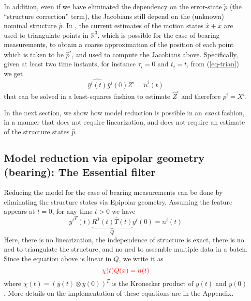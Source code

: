 \documentclass[]{article}
\def\real{\mathbb{R}}
\begin{document}
In addition, even if we have eliminated the dependency on the error-state $\tilde p$ (the ``structure correction'' term), the Jacobians still depend on the (unknown) nominal structure $\hat p$. In \cite{mourikisR07}, the current estimates of the motion states $\hat x+\tilde x$ are used to triangulate points in $\real^3$, which is possible for the case of bearing measurements, to obtain a coarse approximation of the position of each point which is taken to be ${\hat p}^i$, and used to compute the Jacobians above. Specifically, given at least two time instants, for instance $\tau_i = 0$ and $t_i = t$, from (\ref{eq-trian}) we get 
\begin{equation}
 \widehat{{\bar y}^i(t)} \bar y^i(0) Z^i = \tilde n^i(t)
\end{equation}
that can be solved in a least-squares fashion to estimate $\hat Z^i$ and therefore $p^i = X^i$.

In the next section, we show how model reduction is possible in an {\em exact} fashion, in a manner that does not require linearization, and does not require an estimate of the structure states $\hat p$.


\subsection{Model reduction via epipolar geometry (bearing): The Essential filter}

Reducing the model for the case of bearing measurements can be done by eliminating the structure states via Epipolar geometry. Assuming the feature appears at $t = 0$, for any time $t > 0$ we have 
\begin{equation}
{y^i}^T(t) \underbrace{R^T(t) \widehat T(t)}_{Q} y^i(0) = n^i(t)
\end{equation}
Here, there is no linearization, the independence of structure is exact, there is no ned to triangulate the structure, and no ned to assemble multiple data in a batch. Since the equation above is linear in $Q$, we write it as 
\begin{equation}
{\color{red} \chi(t)Q(x) = n(t)}
\end{equation}
where $\chi(t) = (\bar y(t) \otimes \bar y(0))^T$ is the Kronecker product of $y(t)$ and $y(0)$. More details on the implementation of these equations are in the Appendix. 
\end{document}
